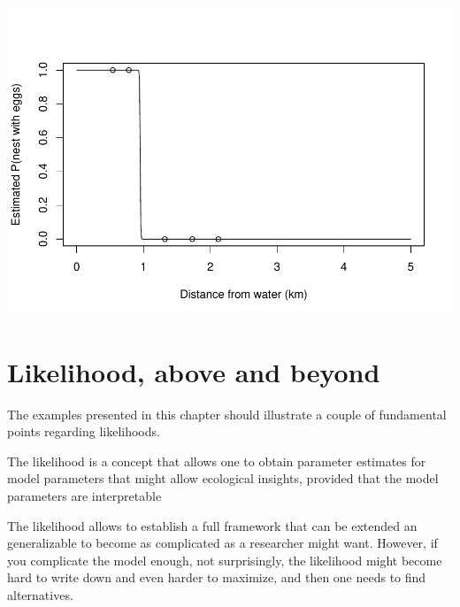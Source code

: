 \documentclass[
]{book}
\newenvironment{Shaded}{\begin{snugshade}}{\end{snugshade}}
\newcommand{\DataTypeTok}[1]{\textcolor[rgb]{0.13,0.29,0.53}{#1}}
\newcommand{\DecValTok}[1]{\textcolor[rgb]{0.00,0.00,0.81}{#1}}
\newcommand{\FloatTok}[1]{\textcolor[rgb]{0.00,0.00,0.81}{#1}}
\newcommand{\KeywordTok}[1]{\textcolor[rgb]{0.13,0.29,0.53}{\textbf{#1}}}
\newcommand{\NormalTok}[1]{#1}
\newcommand{\OperatorTok}[1]{\textcolor[rgb]{0.81,0.36,0.00}{\textbf{#1}}}
\newcommand{\StringTok}[1]{\textcolor[rgb]{0.31,0.60,0.02}{#1}}
\begin{document}
\begin{Shaded}
\end{Shaded}

\includegraphics{ECOMODbook_files/figure-latex/ch13.36-1.pdf}

\hypertarget{likelihood-above-and-beyond}{%
\section{Likelihood, above and beyond}\label{likelihood-above-and-beyond}}

The examples presented in this chapter should illustrate a couple of fundamental points regarding likelihoods.

The likelihood is a concept that allows one to obtain parameter estimates for model parameters that might allow ecological insights, provided that the model parameters are interpretable

The likelihood allows to establish a full framework that can be extended an generalizable to become as complicated as a researcher might want. However, if you complicate the model enough, not surprisingly, the likelihood might become hard to write down and even harder to maximize, and then one needs to find alternatives.
\end{document}
